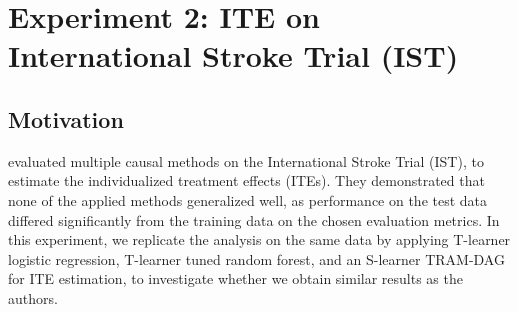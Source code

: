 % 
% 
% 














\section{Experiment 2: ITE on International Stroke Trial (IST)} \label{ch:exp2}





\subsection{Motivation}





% 
% 
\citet{chen2025} evaluated multiple causal methods on the International Stroke Trial (IST), to estimate the individualized treatment effects (ITEs). They demonstrated that none of the applied methods generalized well, as performance on the test data differed significantly from the training data on the chosen evaluation metrics.
In this experiment, we replicate the analysis on the same data by applying T-learner logistic regression, T-learner tuned random forest, and an S-learner TRAM-DAG for ITE estimation, to investigate whether we obtain similar results as the authors.


